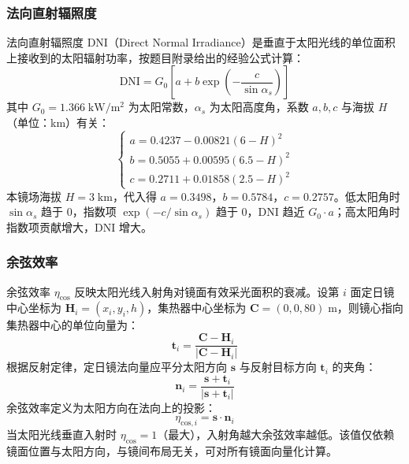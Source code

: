 \documentclass[12pt,a4paper,fontset=fandol]{ctexart}
\begin{document}
\subsubsection{法向直射辐照度}

法向直射辐照度 DNI（Direct Normal Irradiance）是垂直于太阳光线的单位面积上接收到的太阳辐射功率，按题目附录给出的经验公式计算\cite{3}：
\begin{equation}
    \mathrm{DNI} = G_0\left[a + b\exp\!\left(-\frac{c}{\sin\alpha_s}\right)\right]
    \label{eq:DNI}
\end{equation}
其中 $G_0 = 1.366\;\mathrm{kW/m^2}$ 为太阳常数，$\alpha_s$ 为太阳高度角，系数 $a,b,c$ 与海拔 $H$（单位：km）有关：
\begin{equation}
    \begin{cases}
        a = 0.4237 - 0.00821(6 - H)^2 \\[4pt]
        b = 0.5055 + 0.00595(6.5 - H)^2 \\[4pt]
        c = 0.2711 + 0.01858(2.5 - H)^2
    \end{cases}
    \label{eq:DNI_coeff}
\end{equation}
本镜场海拔 $H = 3\;\mathrm{km}$，代入得 $a = 0.3498$，$b = 0.5784$，$c = 0.2757$。低太阳角时 $\sin\alpha_s$ 趋于 $0$，指数项 $\exp(-c/\sin\alpha_s)$ 趋于 $0$，DNI 趋近 $G_0 \cdot a$；高太阳角时指数项贡献增大，DNI 增大。

\subsubsection{余弦效率}

余弦效率 $\eta_{\mathrm{cos}}$ 反映太阳光线入射角对镜面有效采光面积的衰减。设第 $i$ 面定日镜中心坐标为 $\mathbf{H}_i = (x_i, y_i, h)$，集热器中心坐标为 $\mathbf{C} = (0, 0, 80)\;\mathrm{m}$，则镜心指向集热器中心的单位向量为：
\begin{equation}
    \mathbf{t}_i = \frac{\mathbf{C} - \mathbf{H}_i}{|\mathbf{C} - \mathbf{H}_i|}
    \label{eq:t_vector}
\end{equation}
根据反射定律，定日镜法向量应平分太阳方向 $\mathbf{s}$ 与反射目标方向 $\mathbf{t}_i$ 的夹角：
\begin{equation}
    \mathbf{n}_i = \frac{\mathbf{s} + \mathbf{t}_i}{|\mathbf{s} + \mathbf{t}_i|}
    \label{eq:normal}
\end{equation}
余弦效率定义为太阳方向在法向上的投影：
\begin{equation}
    \eta_{\mathrm{cos},i} = \mathbf{s} \cdot \mathbf{n}_i
    \label{eq:eta_cos}
\end{equation}
当太阳光线垂直入射时 $\eta_{\mathrm{cos}} = 1$（最大），入射角越大余弦效率越低。该值仅依赖镜面位置与太阳方向，与镜间布局无关，可对所有镜面向量化计算。
\end{document}
